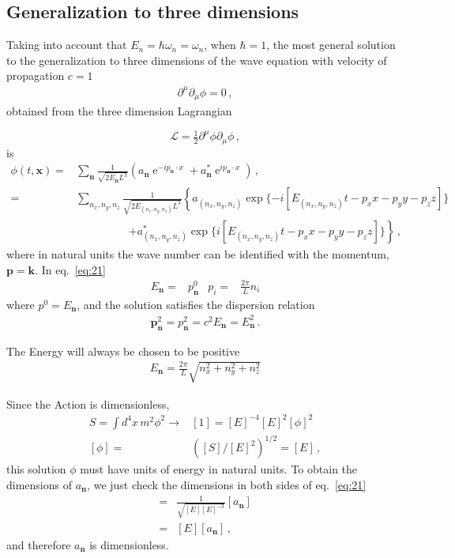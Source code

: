 \subsection{Generalization to three dimensions}
\label{sec:gener-three-dimens}
\begin{frame}
Taking into account that $E_n=\hbar\omega_n=\omega_n$, when $\hbar=1$, the most general solution to the generalization to three dimensions  of the wave equation with velocity of propagation $c=1$
\begin{align}
  \partial^\mu\partial_\mu\phi=0\,,
\end{align}
obtained from the three dimension Lagrangian 

\begin{equation}
  \mathcal{L}=\tfrac{1}{2}\partial^\mu\phi\partial_\mu\phi\,,
\end{equation}
is
\begin{align}
  \label{eq:21}
  \phi(t,\mathbf{x})=&\sum_\mathbf{n}\frac{1}{\sqrt{2E_\mathbf{n} L^3}}
  \left(a_\mathbf{n} \operatorname{e}^{-i p_\mathbf{n}\cdot x }+a_\mathbf{n}^* \operatorname{e}^{i p_\mathbf{n}\cdot x }\right)\,,\nonumber\\
 =&\sum_{n_x,n_y,n_z}\frac{1}{\sqrt{2E_{(n_x,n_y,n_z)} L^3}}
  \left\{a_{(n_x,n_y,n_z)} \exp\{ -i [E_{(n_x,n_y,n_z)}t-p_{x}x-p_{y}y-p_{z}z] \} \right.\nonumber\\
&\hspace{2cm}\left.+a_{(n_x,n_y,n_z)}^* \exp\{ i[ E_{(n_x,n_y,n_z)}t-p_{x}x-p_{y}y-p_{z}z] \} \right\}\,,
\end{align}
where in natural units the wave number can be identified with the momentum, $\mathbf{p}=\mathbf{k}$. In eq.~\eqref{eq:21}
\begin{align}
  E_{\mathbf{n}}=&p^0_{\mathbf{n}} & p_i=&\frac{2\pi}{L}n_i
\end{align}
where $p^0=E_\mathbf{n}$, and the solution satisfies the dispersion relation 
\begin{align}
  \mathbf{p}_{\mathbf{n}}^2=p_{\mathbf{n}}^2=c^2E_{\mathbf{n}}=E_{\mathbf{n}}^2\,.
\end{align}

The Energy will always be chosen to be positive
\begin{align}
  E_{\mathbf{n}}=\frac{2\pi}{L}\sqrt{n_x^2+n_y^2+n_z^2}
\end{align}

Since the Action is dimensionless, 
\begin{align}
  S=\int d^4x\, m^2\phi^2\to& [1]=[E]^{-4}[E]^2[\phi]^2\nonumber\\
  [\phi]=&([S]/[E]^{2})^{1/2}=[E]\,,
\end{align}
this solution $\phi$  must have units of energy in natural units.
To obtain the dimensions of $a_{\mathbf{n}}$, we just check the dimensions in both sides of eq.~\eqref{eq:21}
\begin{align}
  [E]=&\frac{1}{\sqrt{[E][E]^{-3}}}[a_{\mathbf{n}}]\nonumber\\
  =&[E][a_{\mathbf{n}}]\,,
\end{align}
and therefore  $a_{\mathbf{n}}$ is dimensionless.


\end{frame}
